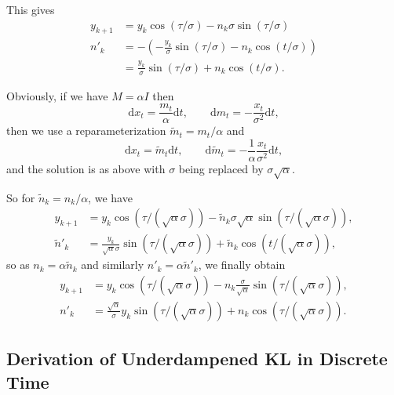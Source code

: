 \documentclass{article} %
\begin{document}
This gives
\begin{align}
    y_{k+1}&=y_k \cos(\tau/\sigma)-n_k \sigma \sin(\tau/\sigma)\\
    n'_k&=-(-\frac{y_k}{\sigma} \sin(\tau/\sigma)-n_k \cos(t/\sigma))\nonumber\\
    &=\frac{y_k}{\sigma} \sin(\tau/\sigma)+n_k \cos(t/\sigma).
\end{align}

Obviously, if we have $M=\alpha I$ then
\begin{equation}
\mathrm{d}x_t=\frac{m_t}{\alpha}\mathrm{d}t,\qquad \mathrm{d}m_t=-\frac{x_t}{\sigma^2}\mathrm{d}t,
\end{equation}
then we use a reparameterization $\tilde{m}_t=m_t/\alpha$ and
\begin{equation}
\mathrm{d}x_t=\tilde{m}_t \mathrm{d}t,\qquad \mathrm{d}\tilde{m}_t=-\frac{1}{\alpha}\frac{x_t}{\sigma^2}\mathrm{d}t,
\end{equation}
and the solution is as above with $\sigma$ being replaced by $\sigma \sqrt{\alpha}$.

So for $\tilde{n}_k=n_k/\alpha$, we have 
\begin{align*}
    y_{k+1}&=y_k \cos(\tau/(\sqrt{\alpha}\sigma))- \tilde{n}_k \sigma\sqrt{\alpha} \sin(\tau/(\sqrt{\alpha}\sigma)),\\
    \tilde{n}'_k&=\frac{y_k}{\sqrt{\alpha}\sigma} \sin(\tau/(\sqrt{\alpha}\sigma))+\tilde{n}_k \cos(t/(\sqrt{\alpha}\sigma)),
\end{align*}
so as $n_k=\alpha\tilde{n}_k$ and similarly $n'_k=\alpha\tilde{n}'_k$, we finally obtain
\begin{align}
   y_{k+1}&=y_k \cos(\tau/(\sqrt{\alpha}\sigma))- n_k \frac{\sigma}{\sqrt{\alpha}} \sin(\tau/(\sqrt{\alpha}\sigma)),\\
   n'_k&=\frac{\sqrt{\alpha}}{\sigma}y_k \sin(\tau/(\sqrt{\alpha}\sigma))+n_k \cos(\tau/(\sqrt{\alpha}\sigma)).
\end{align}

\subsection{Derivation of Underdampened KL in Discrete Time \label{apdx:KLunderdampedDT}}
\end{document}
